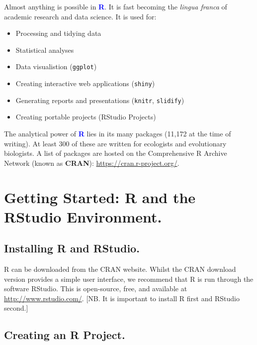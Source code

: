 \documentclass[a4paper,12pt]{article}
\newcommand\boldblue[1]{\textcolor{blue}{\textbf{#1}}}
\begin{document}
Almost anything is possible in \boldblue{R}. It is fast becoming the \textit{lingua franca} of academic research and data science. It is used for:

\begin{itemize}
\item Processing and tidying data 
\item Statistical analyses
\item Data visualistion (\texttt{ggplot})
\item Creating interactive web applications (\texttt{shiny})
\item Generating reports and presentations (\texttt{knitr}, \texttt{slidify})
\item Creating portable projects (RStudio Projects)
\end{itemize}

The analytical power of \boldblue{R} lies in its many packages (11,172 at the time of writing). At least 300 of these are written for ecologists and evolutionary biologists. A list of packages are hosted on the Comprehensive R Archive Network (known as \textbf{CRAN}): \url{https://cran.r-project.org/}.

% 


\section {Getting Started: R and the RStudio Environment.}
\subsection {Installing R and RStudio.}

R can be downloaded from the CRAN website. Whilst the CRAN download version provides a simple user interface, we recommend that R is run through the software RStudio. This is open-source, free, and available at \url{http://www.rstudio.com/}. [NB. It is important to install R first and RStudio second.]


\subsection {Creating an R Project.}
\end{document}

